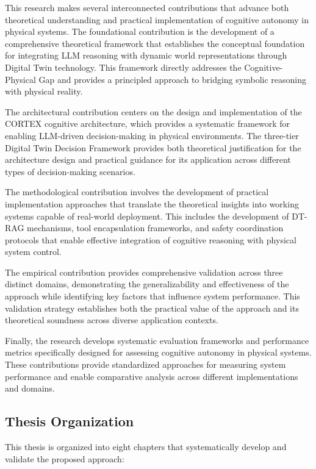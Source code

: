 This research makes several interconnected contributions that advance both theoretical understanding and practical implementation of cognitive autonomy in physical systems. The foundational contribution is the development of a comprehensive theoretical framework that establishes the conceptual foundation for integrating LLM reasoning with dynamic world representations through Digital Twin technology. This framework directly addresses the Cognitive-Physical Gap and provides a principled approach to bridging symbolic reasoning with physical reality.

The architectural contribution centers on the design and implementation of the CORTEX cognitive architecture, which provides a systematic framework for enabling LLM-driven decision-making in physical environments. The three-tier Digital Twin Decision Framework provides both theoretical justification for the architecture design and practical guidance for its application across different types of decision-making scenarios.

The methodological contribution involves the development of practical implementation approaches that translate the theoretical insights into working systems capable of real-world deployment. This includes the development of DT-RAG mechanisms, tool encapsulation frameworks, and safety coordination protocols that enable effective integration of cognitive reasoning with physical system control.

The empirical contribution provides comprehensive validation across three distinct domains, demonstrating the generalizability and effectiveness of the approach while identifying key factors that influence system performance. This validation strategy establishes both the practical value of the approach and its theoretical soundness across diverse application contexts.

Finally, the research develops systematic evaluation frameworks and performance metrics specifically designed for assessing cognitive autonomy in physical systems. These contributions provide standardized approaches for measuring system performance and enable comparative analysis across different implementations and domains.

\subsection{Thesis Organization}

This thesis is organized into eight chapters that systematically develop and validate the proposed approach:

